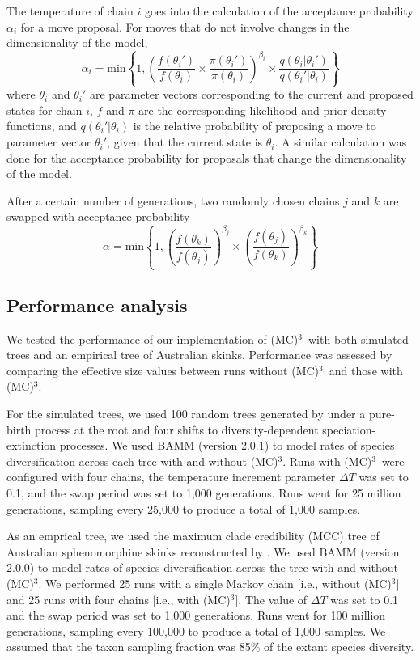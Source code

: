 \documentclass[12pt]{article}
\newcommand{\MCMCMC}{(MC)$^{3}$}
\begin{document}
The temperature of chain $i$ goes into the calculation
of the acceptance probability $\alpha_i$ for a move proposal.
%
For moves that do not involve changes in the dimensionality of the model,
\[\alpha_i = \text{min}\left\{ 1,
    \left(
    \frac{f(\theta_i')}{f(\theta_i)} \times
    \frac{\pi(\theta_i')}{\pi(\theta_i)}
    \right)^{\beta_i} \times
    \frac{q(\theta_i | \theta_i')}{q(\theta_i' | \theta_i)}
\right\}\]
where $\theta_i$ and $\theta_i'$ are parameter vectors
corresponding to the current and proposed states for chain $i$,
$f$ and $\pi$ are the corresponding likelihood and prior density functions,
and $q(\theta_i' | \theta_i)$ is the relative probability
of proposing a move to parameter vector $\theta_i'$,
given that the current state is $\theta_i$.
%
A similar calculation was done for the acceptance probability for proposals
that change the dimensionality of the model.

After a certain number of generations, two randomly chosen chains $j$ and $k$
are swapped with acceptance probability
\[\alpha = \text{min}\left\{ 1,
    \left(\frac{f(\theta_k)}{f(\theta_j)}\right)^{\beta_j} \times
    \left(\frac{f(\theta_j)}{f(\theta_k)}\right)^{\beta_k}
\right\}\]


\subsection*{Performance analysis}

We tested the performance of our implementation of \MCMCMC\ 
with both simulated trees and an empirical tree of Australian skinks.
%
Performance was assessed by comparing the effective size values
between runs without \MCMCMC\ and those with \MCMCMC.


For the simulated trees, we used 100 random trees generated by \citet{rab14plos}
under a pure-birth process at the root and four shifts
to diversity-dependent speciation-extinction processes.
%
We used BAMM (version 2.0.1) to model rates of species diversification
across each tree with and without \MCMCMC.
%
Runs with \MCMCMC\ were configured with four chains,
the temperature increment parameter $\Delta T$ was set to 0.1,
and the swap period was set to 1,000 generations.
%
Runs went for 25 million generations,
sampling every 25,000 to produce a total of 1,000 samples.


As an emprical tree, we used the maximum clade credibility (MCC) tree
of Australian sphenomorphine skinks reconstructed by \citet{rab14sysbio}.
%
We used BAMM (version 2.0.0) to model rates of species diversification
across the tree with and without \MCMCMC.
%
We performed 25 runs with a single Markov chain [i.e., without \MCMCMC]
and 25 runs with four chains [i.e., with \MCMCMC].
%
The value of $\Delta T$ was set to 0.1
and the swap period was set to 1,000 generations.
%
Runs went for 100 million generations,
sampling every 100,000 to produce a total of 1,000 samples.
%
We assumed that the taxon sampling fraction was 85\%
of the extant species diversity.
\end{document}
